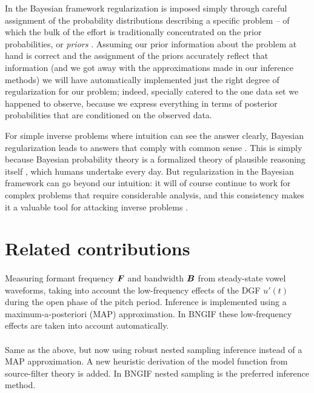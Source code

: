 \begin{chapterappendices}{1}
In the Bayesian framework regularization is imposed simply through careful assignment of the probability distributions describing a specific problem -- of which the bulk of the effort is traditionally concentrated on the prior probabilities, or \emph{priors} \citep{Sivia2006}.
Assuming our prior information about the problem at hand is correct and the assignment of the priors accurately reflect that information (and we got away with the approximations made in our inference methods) we will have automatically implemented just the right degree of regularization for our problem; indeed, specially catered to the one data set we happened to observe, because we express everything in terms of posterior probabilities that are conditioned on the observed data.

For simple inverse problems where intuition can see the answer clearly, Bayesian regularization leads to answers that comply with common sense \citep{MacKay2005}.
This is simply because Bayesian probability theory is a formalized theory of plausible reasoning itself \citep{Skilling2005}, which humans undertake every day.
But regularization in the Bayesian framework can go beyond our intuition: it will of course continue to work for complex problems that require considerable analysis, and this consistency makes it a valuable tool for attacking inverse problems \citep{Calvetti2018}.

\section{Related contributions\label{app:othercontributions}}

\paragraph{\cite{VanSoom2019a}}
Measuring formant frequency ${\bm F}$ and bandwidth ${\bm B}$ from steady-state vowel waveforms, taking into account the low-frequency effects of the DGF $u'(t)$ during the open phase of the pitch period.
Inference is implemented using a maximum-a-posteriori (MAP) approximation.
In BNGIF these low-frequency effects are taken into account automatically.

\paragraph{\cite{VanSoom2020}}
Same as the above, but now using robust nested sampling inference instead of a MAP approximation.
A new heuristic derivation of the model function from source-filter theory is added.
In BNGIF nested sampling is the preferred inference method.


\end{chapterappendices}
